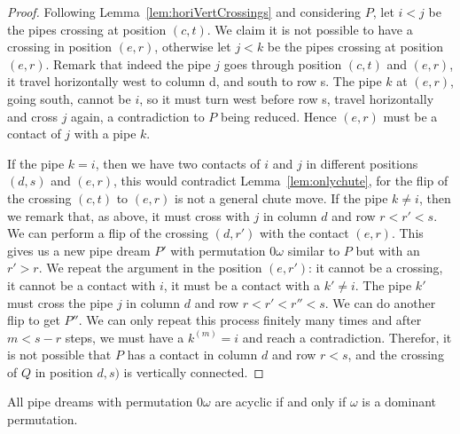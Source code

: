 \begin{proof}
Following Lemma~\ref{lem:horiVertCrossings} and considering $P$, let $i<j$ be the pipes crossing at position $(c,t)$. 
We claim it is not possible to have a crossing in position $(e,r)$, otherwise let $j<k$ be the pipes crossing at position $(e,r)$.
Remark that indeed the pipe $j$ goes through position $(c,t)$ and $(e,r)$, it travel  horizontally west to column d, and south to row s. 
The pipe $k$ at $(e,r)$, going south, cannot be $i$, so it must turn west before row s, travel horizontally and cross $j$ again, a contradiction to $P$ being reduced.
Hence $(e,r)$ must be a contact of $j$ with a pipe $k$.

If the pipe $k=i$, then we have two contacts of $i$ and $j$ in different positions $(d,s)$ and $(e,r)$, this would contradict Lemma~\ref{lem:onlychute}, for the flip of the crossing $(c,t)$
to $(e,r)$ is not a general chute move. If the pipe $k\ne i$, then we remark that, as above, it must cross with $j$ in column $d$ and row $r<r'<s$. We can perform a flip of the crossing
$(d,r')$ with the contact $(e,r)$. This gives us a new pipe dream $P'$ with permutation $0\omega$ similar to $P$ but with an $r'>r$. We repeat the argument in the position $(e,r')$: it cannot be a crossing,
it cannot be a contact with $i$, it must be a contact with a $k'\ne i$. The pipe $k'$ must cross the pipe $j$ in column $d$ and row $r<r'<r''<s$. We can do another flip to get $P''$.
We can only repeat this process finitely many times and after $m<s-r$ steps, we must have a $k^{(m)}=i$ and reach a contradiction. 
Therefor, it is not possible that $P$ has a contact in column $d$ and row $r<s$, and the crossing of $Q$ in position $d,s)$ is vertically connected.
\end{proof}

\begin{theorem}%
\label{prob:nuAcyclicProperty}
All pipe dreams with permutation $0 \omega$ are acyclic if and only if $\omega$ is a dominant permutation.
\end{theorem}

